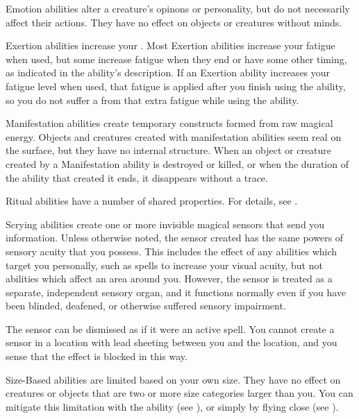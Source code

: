      Emotion abilities alter a creature's opinons or personality, but do not necessarily affect their actions.
    They have no effect on objects or creatures without minds.

     Exertion abilities increase your .
    Most Exertion abilities increase your fatigue when used, but some increase fatigue when they end or have some other timing, as indicated in the ability's description.
    If an Exertion ability increases your fatigue level when used, that fatigue is applied after you finish using the ability, so you do not suffer a  from that extra fatigue while using the ability.

     Manifestation abilities create temporary constructs formed from raw magical energy.
    Objects and creatures created with manifestation abilities seem real on the surface, but they have no internal structure.
    When an object or creature created by a Manifestation ability is destroyed or killed, or when the duration of the ability that created it ends, it disappears without a trace.

     Ritual abilities have a number of shared properties.
    For details, see .

     Scrying abilities create one or more invisible magical sensors that send you information.
    Unless otherwise noted, the sensor created has the same powers of sensory acuity that you possess.
    This includes the effect of any abilities which target you personally, such as spells to increase your visual acuity, but not abilities which affect an area around you.
    However, the sensor is treated as a separate, independent sensory organ, and it functions normally even if you have been blinded, deafened, or otherwise suffered sensory impairment.
    \par The sensor can be dismissed as if it were an active spell.
    You cannot create a sensor in a location with lead sheeting between you and the location, and you sense that the effect is blocked in this way.

     Size-Based abilities are limited based on your own size.
    They have no effect on creatures or objects that are two or more size categories larger than you.
    You can mitigate this limitation with the  ability (see ), or simply by flying close (see ).


